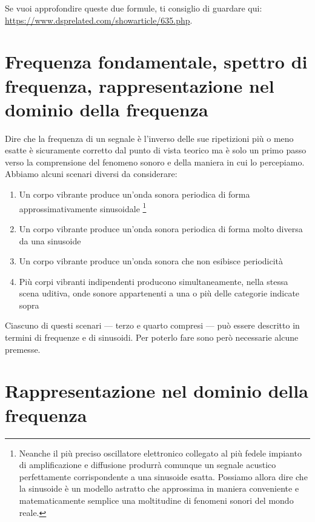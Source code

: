 \documentclass[11pt]{report}
\begin{document}
Se vuoi approfondire queste due formule, ti consiglio di guardare qui: \url{https://www.dsprelated.com/showarticle/635.php}.



\section{Frequenza fondamentale, spettro di frequenza, rappresentazione nel dominio della frequenza}

Dire che la frequenza di un segnale è l'inverso delle sue ripetizioni più o meno esatte è sicuramente corretto dal punto di vista teorico ma è solo un primo passo verso la comprensione del fenomeno sonoro e della maniera in cui lo percepiamo. Abbiamo alcuni scenari diversi da considerare:

\begin{enumerate}

\item Un corpo vibrante produce un'onda sonora periodica di forma approssimativamente sinusoidale%
\footnote{Neanche il più preciso oscillatore elettronico collegato al più fedele impianto di amplificazione e diffusione produrrà comunque un segnale acustico perfettamente corrispondente a una sinusoide esatta. Possiamo allora dire che la sinusoide è un modello astratto che approssima in maniera conveniente e matematicamente semplice una moltitudine di fenomeni sonori del mondo reale.}

\item Un corpo vibrante produce un'onda sonora periodica di forma molto diversa da una sinusoide

\item Un corpo vibrante produce un'onda sonora che non esibisce periodicità

\item Più corpi vibranti indipendenti producono simultaneamente, nella stessa scena uditiva, onde sonore appartenenti a una o più delle categorie indicate sopra

\end{enumerate}

Ciascuno di questi scenari --- terzo e quarto compresi --- può essere descritto in termini di frequenze e di sinusoidi. Per poterlo fare sono però necessarie alcune premesse.




\section{Rappresentazione nel dominio della frequenza}
\end{document}
